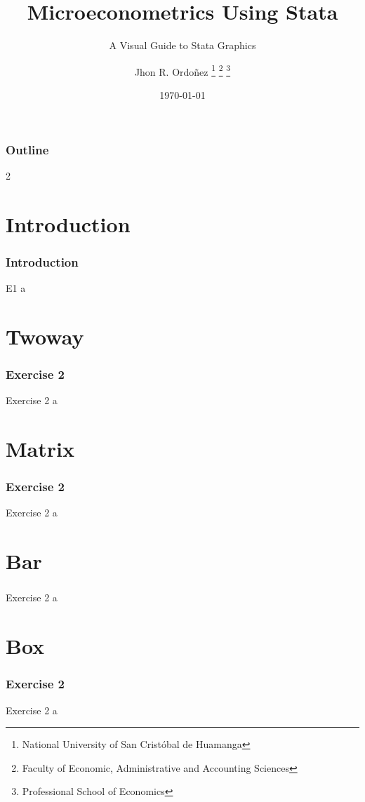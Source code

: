 \documentclass[11pt, aspectratio=169]{beamer}
\title{Microeconometrics Using Stata}
\subtitle{A Visual Guide to Stata Graphics}
\author{
		Jhon R. Ordoñez
		\footnote{\label{1} National University of San Cristóbal de Huamanga}
		\footnote{\label{2} Faculty of Economic, Administrative and Accounting Sciences}
		\footnote{\label{3} Professional School of Economics}
	}
\date{\today}
\begin{document}
	\begin{frame}
		\maketitle
	\end{frame}
	\begin{frame}[t]
		\frametitle{Outline}
		\begin{multicols}{2}
			\tableofcontents
		\end{multicols}
	\end{frame}
	\section{Introduction}
		\begin{frame}
			\frametitle{Introduction}
				\begin{block}{E1}
					a
				\end{block}
		\end{frame}
	\section{Twoway}
		\begin{frame}
			\frametitle{Exercise 2}
			\begin{block}{Exercise 2}
				a
			\end{block}
		\end{frame}
	\section{Matrix}
		\begin{frame}
			\frametitle{Exercise 2}
			\begin{block}{Exercise 2}
				a
			\end{block}
		\end{frame}
	\section{Bar}
		\begin{frame}
			\frametitle{}
			\begin{block}{Exercise 2}
				a
			\end{block}
		\end{frame}
	\section{Box}
		\begin{frame}
			\frametitle{Exercise 2}
			\begin{block}{Exercise 2}
				a
			\end{block}
		\end{frame}
\end{document}
